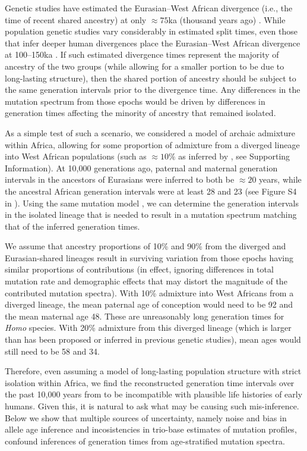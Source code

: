 \documentclass[]{article}
\begin{document}
Genetic studies have estimated the Eurasian--West African divergence (i.e., the
time of recent shared ancestry) at only $\approx 75$ka (thousand years ago)
\citep[e.g.,][]{pagani2015tracing,bergstrom2020insights}. While population
genetic studies vary considerably in estimated split times, even those that
infer deeper human divergences place the Eurasian--West African divergence at
100--150ka \citep[e.g.,][]{schlebusch2017southern}. If such estimated
divergence times represent the majority of ancestry of the two groups (while
allowing for a smaller portion to be due to long-lasting structure), then the
shared portion of ancestry should be subject to the same generation intervals
prior to the divergence time. Any differences in the mutation spectrum from
those epochs would be driven by differences in generation times affecting the
minority of ancestry that remained isolated. 

As a simple test of such a scenario, we considered a model of archaic admixture
within Africa, allowing for some proportion of admixture from a diverged
lineage into West African populations (such as $\approx10\%$ as inferred by
\citet{durvasula2020recovering}, see Supporting Information). At 10,000
generations ago, paternal and maternal generation intervals in the ancestors of
Eurasians were inferred to both be $\approx20$ years, while the ancestral
African generation intervals were at least 28 and 23 (see Figure S4 in
\citet{wang2023human}). Using the same mutation model
\citep{jonsson2017parental}, we can determine the generation intervals in the
isolated lineage that is needed to result in a mutation spectrum matching that
of the inferred generation times.

We assume that ancestry proportions of 10\% and 90\% from the diverged and
Eurasian-shared lineages result in surviving variation from those epochs having
similar proportions of contributions (in effect, ignoring differences in total
    mutation rate and demographic effects that may distort the magnitude of the
contributed mutation spectra). With 10\% admixture into West Africans from a
diverged lineage, the mean paternal age of conception would need to be 92 and
the mean maternal age 48. These are unreasonably long generation times for
\emph{Homo} species. With 20\% admixture from this diverged lineage (which is
larger than has been proposed or inferred in previous genetic studies), mean
ages would still need to be 58 and 34.

Therefore, even assuming a model of long-lasting population structure with
strict isolation within Africa, we find the reconstructed generation time
intervals over the past 10,000 years from \citet{wang2023human} to be
incompatible with plausible life histories of early humans. Given this, it is
natural to ask what may be causing such mis-inference. Below we show that
multiple sources of uncertainty, namely noise and bias in allele age inference
and incosistencies in trio-base estimates of mutation profiles, confound
inferences of generation times from age-stratified mutation spectra.
\end{document}
